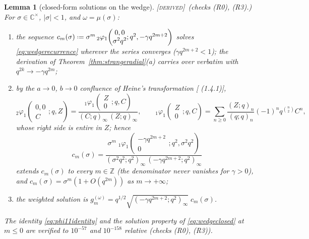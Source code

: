 \documentclass[11pt,a4paper]{article}
\providecommand{\coloneqq}{\mathrel{\vcenter{\baselineskip0.5ex \lineskiplimit0pt
      \hbox{\scriptsize.}\hbox{\scriptsize.}}}=}
\newcommand{\DERIVED}{{\color{teal}\textsc{[derived]}}}
\theoremstyle{definition}
\theoremstyle{plain}
\newtheorem{lemma}[definition]{Lemma}
\newcommand{\Z}{\mathbb{Z}}
\newcommand{\C}{\mathbb{C}}
\begin{document}
\begin{lemma}[closed-form solutions on the wedge]\label{lem:wedgesolutions}
\DERIVED\ (checks (R0), (R3).) For $\sigma\in\C^{\times}$, $|\sigma|<1$, and
$\omega=\mu(\sigma)$:
\begin{enumerate}[label=(\alph*)]
\item the sequence
$c_{m}(\sigma)\coloneqq\sigma^{m}\,{}_{2}\varphi_{1}\!\left(\begin{matrix}0,0\\
\sigma^{2}q^{2}\end{matrix};q^{2},-\gamma q^{2m+2}\right)$ solves \eqref{eq:wedgerecurrence}
wherever the series converges ($\gamma q^{2m+2}<1$); the derivation of
Theorem~\ref{thm:strangeradial}(a) carries over verbatim with $q^{2k}\to-\gamma q^{2m}$;
\item by the $a\to0$, $b\to0$ confluence of Heine's transformation
[\cite{GasperRahman} (1.4.1)],
\begin{equation}\label{eq:phi11identity}
  {}_{2}\varphi_{1}\!\left(\begin{matrix}0,0\\ C\end{matrix};q,Z\right)
  =\frac{{}_{1}\varphi_{1}\!\left(\begin{matrix}Z\\ 0\end{matrix};q,C\right)}
        {(C;q)_{\infty}\,(Z;q)_{\infty}},\qquad
  {}_{1}\varphi_{1}\!\left(\begin{matrix}Z\\ 0\end{matrix};q,C\right)
  =\sum_{n\ge0}\frac{(Z;q)_{n}}{(q;q)_{n}}(-1)^{n}q^{\binom n2}C^{n},
\end{equation}
whose right side is entire in $Z$; hence
\begin{equation}\label{eq:wedgeclosed}
  c_{m}(\sigma)=\frac{\sigma^{m}\;{}_{1}\varphi_{1}\!\left(\begin{matrix}-\gamma
  q^{2m+2}\\ 0\end{matrix};q^{2},\sigma^{2}q^{2}\right)}
  {(\sigma^{2}q^{2};q^{2})_{\infty}\,(-\gamma q^{2m+2};q^{2})_{\infty}}
\end{equation}
extends $c_{m}(\sigma)$ to \emph{every} $m\in\Z$ (the denominator never vanishes for
$\gamma>0$), and $c_{m}(\sigma)=\sigma^{m}(1+O(q^{2m}))$ as $m\to+\infty$;
\item the weighted solution is
$g^{(\omega)}_{m}=q^{1/2}\sqrt{(-\gamma q^{2m+2};q^{2})_{\infty}}\;c_{m}(\sigma)$.
\end{enumerate}
The identity \eqref{eq:phi11identity} and the solution property of \eqref{eq:wedgeclosed} at
$m\le0$ are verified to $10^{-57}$ and $10^{-158}$ relative (checks (R0), (R3)).
\end{lemma}
\end{document}
